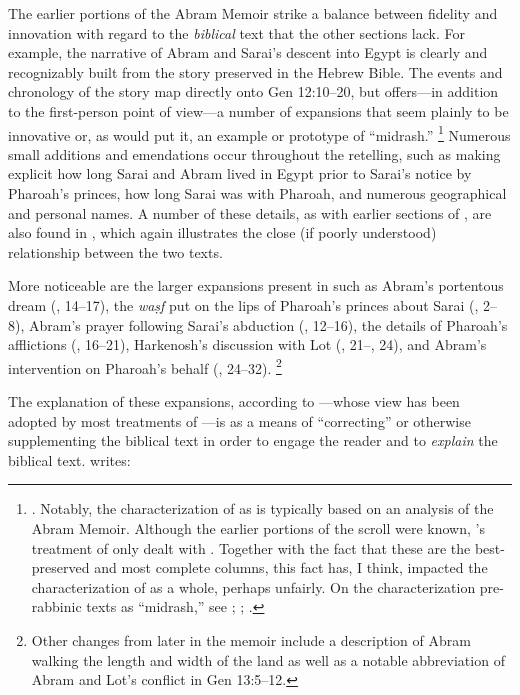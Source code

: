 The earlier portions of the Abram Memoir strike a balance between fidelity and innovation with regard to the \emph{biblical} text that the other sections lack. For example, the narrative of Abram and Sarai's descent into Egypt is clearly and recognizably built from the story preserved in the Hebrew Bible. The events and chronology of the story map directly onto Gen 12:10--20, but \ga offers---in addition to the first-person point of view---a number of expansions that seem plainly to be innovative or, as \vermes would put it, an example or prototype of ``midrash.''%
    \footnote{\Cite[124]{vermes1961}. Notably, the characterization of \ga as \rwb is typically based on an analysis of the Abram Memoir. Although the earlier portions of the scroll were known, \vermes's treatment of \ga only dealt with . Together with the fact that these are the best-preserved and most complete columns, this fact has, I think, impacted the characterization of \ga as a whole, perhaps unfairly. On the characterization pre-rabbinic texts as ``midrash,'' see \cite[esp. 298--305]{mandel2017}; \cite{mandel_dsd2001}; \cite{mandel_bakhos2006}.}
Numerous small additions and emendations occur throughout the retelling, such as making explicit how long Sarai and Abram lived in Egypt prior to Sarai's notice by Pharoah's princes, how long Sarai was with Pharoah, and numerous geographical and personal names. A number of these details, as with earlier sections of \ga, are also found in \jub, which again illustrates the close (if poorly understood) relationship between the two texts.

More noticeable are the larger expansions present in \ga such as Abram's portentous dream (, 14--17), the \emph{waṣf} put on the lips of Pharoah's princes about Sarai (, 2--8), Abram's prayer following Sarai's abduction (, 12--16), the details of Pharoah's afflictions (, 16--21), Harkenosh's discussion with Lot (, 21--, 24), and Abram's intervention on Pharoah's behalf (, 24--32).%
    \footnote{Other changes from later in the memoir include a description of Abram walking the length and width of the land as well as a notable abbreviation of Abram and Lot's conflict in Gen 13:5--12.}

The explanation of these expansions, according to \vermes---whose view has been adopted by most treatments of \ga---is as a means of ``correcting'' or otherwise supplementing the biblical text in order to engage the reader and to \emph{explain} the biblical text.%
    \autocite[126]{vermes1961}
\vermes writes:

